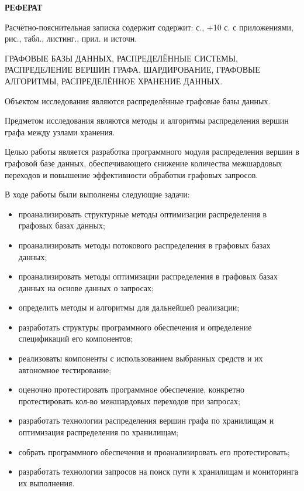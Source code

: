 \begin{center}
    \textbf{РЕФЕРАТ}
    \vspace{-12pt}
\end{center}

Расчётно-пояснительная записка содержит содержит: \pageref{bib:end} с., {\the\numexpr{}+10} с. с приложениями,  рис.,  табл.,  листинг.,  прил. и  источн.

\noindent ГРАФОВЫЕ БАЗЫ ДАННЫХ, РАСПРЕДЕЛЁННЫЕ СИСТЕМЫ, РАСПРЕДЕЛЕНИЕ ВЕРШИН ГРАФА, ШАРДИРОВАНИЕ, ГРАФОВЫЕ АЛГОРИТМЫ, РАСПРЕДЕЛЁННОЕ ХРАНЕНИЕ ДАННЫХ.

Объектом исследования являются распределённые графовые базы данных.

Предметом исследования являются методы и алгоритмы распределения вершин графа между узлами хранения.

Целью работы является разработка программного модуля распределения вершин в графовой базе данных, обеспечивающего снижение количества межшардовых переходов и повышение эффективности обработки графовых запросов.

В ходе работы были выполнены следующие задачи:
\begin{itemize}
\item проанализировать структурные методы оптимизации распределения в графовых базах данных;
\item проанализировать методы потокового распределения в графовых базах данных;
\item проанализировать методы оптимизации распределения в графовых базах данных на основе данных о запросах;
\item определить методы и алгоритмы для дальнейшей реализации;
\item разработать структуры программного обеспечения и определение спецификаций его компонентов;
\item реализоваты компоненты с использованием выбранных средств и их автономное тестирование;
\item оценочно протестировать программное обеспечение, конкретно протестировать кол-во межшардовых переходов при запросах;
\item разработать технологии распределения вершин графа по хранилищам и оптимизация распределения по хранилищам;
\item собрать программного обеспечения и проанализировать его протестировать;
\item разработать технологии запросов на поиск пути к хранилищам и мониторинга их выполнения.
\end{itemize}

